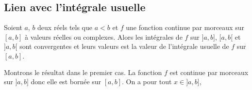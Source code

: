 \documentclass[french,11pt,twoside]{VcCours}
\newcommand{\dt}{\text{d}t}
\begin{document}
\begin{Demonstration}{} 

\end{Demonstration}
\newpage

\subsection{Lien avec l'intégrale \og usuelle \fg}

\begin{Proposition}{} Soient $a$, $b$ deux réels tels que $a < b$ et $f$ une fonction continue par morceaux sur $[a,b]$ à valeurs réelles ou complexes. Alors les intégrales de $f$ sur $]a,b]$, $[a,b[$ et $]a,b[$ sont convergentes et leurs valeurs est la valeur de l'intégrale usuelle de $f$ sur $[a,b]$.
\end{Proposition}

\begin{Demonstration}{} Montrons le résultat dans le premier cas. La fonction $f$ est continue par morceaux sur $]a,b]$ donc elle est bornée sur $[a,b]$. On a pour tout $x \in ]a,b]$,


\vspace{6cm}
\end{Demonstration}
\end{document}
